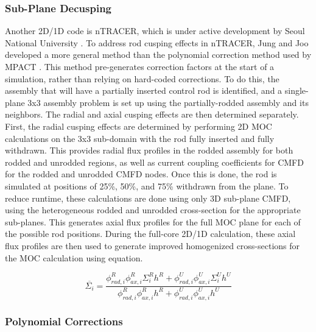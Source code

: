 \subsubsection{Sub-Plane Decusping}\label{sss:ntracerDecusping}

Another 2D/1D code is nTRACER, which is under active development by Seoul National University \cite{RyuBEAVRSnTRACER2015}.  To address rod cusping effects in nTRACER, Jung and Joo developed a more general method than the polynomial correction method used by MPACT \cite{ICAPPcontrolRodDecuspingNTRACER}.  This method pre-generates correction factors at the start of a simulation, rather than relying on hard-coded corrections.  To do this, the assembly that will have a partially inserted control rod is identified, and a single-plane 3x3 assembly problem is set up using the partially-rodded assembly and its neighbors.  The radial and axial cusping effects are then determined separately.  First, the radial cusping effects are determined by performing 2D MOC calculations on the 3x3 sub-domain with the rod fully inserted and fully withdrawn.  This provides radial flux profiles in the rodded assembly for both rodded and unrodded regions, as well as current coupling coefficients for CMFD for the rodded and unrodded CMFD nodes.  Once this is done, the rod is simulated at positions of 25\%, 50\%, and 75\% withdrawn from the plane.  To reduce runtime, these calculations are done using only 3D sub-plane CMFD, using the heterogeneous rodded and unrodded cross-section for the appropriate sub-planes.  This generates axial flux profiles for the full MOC plane for each of the possible rod positions.  During the full-core 2D/1D calculation, these axial flux profiles are then used to generate improved homogenized cross-sections for the MOC calculation using equation.

\begin{equation}\label{e:nTRACERdecusping}
\overline{\Sigma_i} = \frac{\phi_{rad,i}^R \phi_{ax,i}^R \Sigma_i^R h^R + \phi_{rad,i}^U \phi_{ax,i}^U \Sigma_i^U h^U}{\phi_{rad,i}^R \phi_{ax,i}^R h^R + \phi_{rad,i}^U \phi_{ax,i}^U h^U}
\end{equation}

\subsubsection{Polynomial Corrections}\label{sss:polynomialDecusping}

